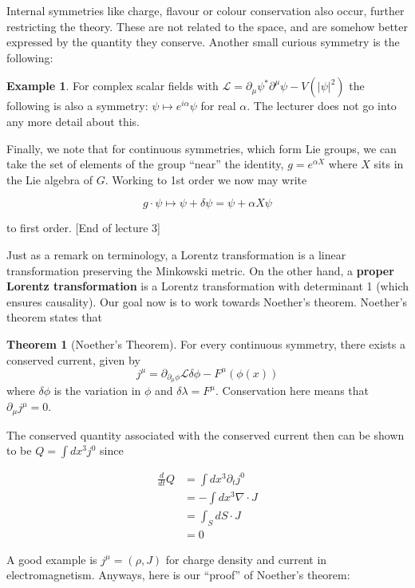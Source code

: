 \documentclass{article}
\theoremstyle{definition}
\newtheorem{example}{Example}
\newtheorem{theorem}{Theorem}
\begin{document}
Internal symmetries like charge, flavour or colour conservation also occur,
further restricting the theory. These are not related to the space, and are
somehow better expressed by the quantity they conserve. Another small curious
symmetry is the following:

\begin{example}
For complex scalar fields with $\mathcal{L} = \partial_\mu \psi^* \partial^\mu
\psi - V(|\psi|^2)$ the following is also a symmetry: $\psi \mapsto e^{i \alpha}
\psi$ for real $\alpha$. The lecturer does not go into any more detail about
this.
\end{example}

Finally, we note that for continuous symmetries, which form Lie groups, we can
take the set of elements of the group ``near'' the identity, $g = e^{\alpha X}$
where $X$ sits in the Lie algebra of $G$. Working to 1st order we now may write

$$ g \cdot \psi \mapsto \psi + \delta \psi = \psi + \alpha X \psi $$

to first order. [End of lecture 3]

Just as a remark on terminology, a Lorentz transformation is a linear
transformation preserving the Minkowski metric. On the other hand, a
\textbf{proper Lorentz transformation} is a Lorentz transformation with
determinant 1 (which ensures causality). 
Our goal now is to work towards Noether's theorem. Noether's theorem states that \begin{theorem}[Noether's Theorem] For every continuous symmetry, there exists a conserved current, given by
  $$ j^\mu = \partial_{\partial_\mu \phi} \mathcal{L} \delta \phi -
  F^\mu(\phi(x)) $$
  where $\delta \phi$ is the variation in $\phi$ and $\delta \mathcal{\lambda} =
  F^\mu$.
  Conservation here means that $\partial_\mu j^\mu = 0$.
\end{theorem}

The conserved quantity associated with the conserved current then can be shown
to be $Q = \int dx^3 j^0$ since

\begin{align*}
  \frac{d}{dt} Q
  &= \int dx^3 \partial_t j^0 \\
  &= - \int dx^3 \nabla \cdot J \\
  &= \int_S dS \cdot J \\
  &= 0
\end{align*}

A good example is $j^\mu = (\rho, J)$ for charge density and current in
electromagnetism. Anyways, here is our ``proof'' of Noether's theorem:
\end{document}
